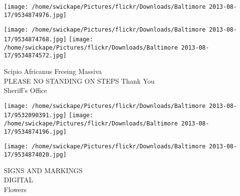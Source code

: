\documentclass[10pt,letterpaper]{article}
\begin{document}
\texttt{[image: /home/swickape/Pictures/flickr/Downloads/Baltimore 2013-08-17/9534874976.jpg]}

\vspace{0.25in}
\texttt{[image: /home/swickape/Pictures/flickr/Downloads/Baltimore 2013-08-17/9534874768.jpg]}
\texttt{[image: /home/swickape/Pictures/flickr/Downloads/Baltimore 2013-08-17/9534874572.jpg]}

Scipio Africanus Freeing Massiva\\
PLEASE NO STANDING ON STEPS Thank You\\
Sheriff's Office\\
\pagebreak

\texttt{[image: /home/swickape/Pictures/flickr/Downloads/Baltimore 2013-08-17/9532090391.jpg]}
\texttt{[image: /home/swickape/Pictures/flickr/Downloads/Baltimore 2013-08-17/9534874196.jpg]}

\texttt{[image: /home/swickape/Pictures/flickr/Downloads/Baltimore 2013-08-17/9534874020.jpg]}

SIGNS AND MARKINGS\\
DIGITAL\\
Flowers\\
\pagebreak
\end{document}
